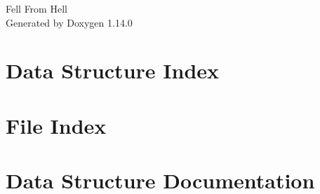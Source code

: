 \documentclass[twoside]{book}
\newcommand{\+}{\discretionary{\mbox{\scriptsize$\hookleftarrow$}}{}{}}
\newcommand{\clearemptydoublepage}{%
    \newpage{\pagestyle{empty}\cleardoublepage}%
  }
\begin{document}
  \raggedbottom
    \hypersetup{pageanchor=false,
                bookmarksnumbered=true,
                pdfencoding=unicode
               }
  \begin{titlepage}
  \vspace*{7cm}
  \begin{center}%
  {\Large Fell From Hell}\\
  \vspace*{1cm}
  {\large Generated by Doxygen 1.14.0}\\
  \end{center}
  \end{titlepage}
  \clearemptydoublepage
  \tableofcontents
  \clearemptydoublepage
  \hypersetup{pageanchor=true}
\chapter{Data Structure Index}

\chapter{File Index}

\chapter{Data Structure Documentation}




























\end{document}
